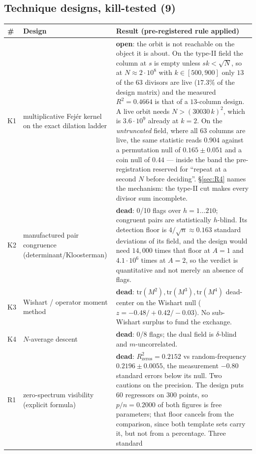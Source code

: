 \documentclass[11pt,a4paper]{article}
\theoremstyle{plain}
\theoremstyle{definition}
\begin{document}
\subsection{Technique designs, kill-tested (9)}

\begin{longtable}{p{}p{}p{}}
\hline
\# & Design & Result (pre-registered rule applied)\\
\hline
\endhead
K1 & multiplicative Fej\'er kernel on the exact dilation ladder &
 \textbf{open}: the orbit is not reachable on the object it is about.
 On the type-II field the column at $s$ is empty unless
 $sk<\sqrt N$, so at $N\approx2\cdot10^8$ with $k\in[500,900]$ only
 $13$ of the $63$ divisors are live ($17.3\%$ of the design matrix)
 and the measured $R^2 = 0.4664$ is that of a $13$-column design. A
 live orbit needs $N > (30030\,k)^2$, which is $3.6\cdot10^9$ already
 at $k=2$. On the \emph{untruncated} field, where all $63$ columns are
 live, the same statistic reads $0.904$ against a permutation null of
 $0.165\pm0.051$ and a coin null of $0.44$ --- inside the band the
 pre-registration reserved for ``repeat at a second $N$ before
 deciding''. \S\ref{sec:R4} names the mechanism: the type-II cut makes
 every divisor sum incomplete.\\
K2 & manufactured pair congruence (determinant/Kloosterman) &
 \textbf{dead}: 0/10 flags over $h = 1\ldots210$; congruent pairs are
 statistically $h$-blind. Its detection floor is
 $4/\sqrt n \approx 0.163$ standard deviations of its field, and the
 design would need $14{,}000$ times that floor at $A=1$ and
 $4.1\cdot10^6$ times at $A=2$, so the verdict is quantitative and not
 merely an absence of flags.\\
K3 & Wishart / operator moment method &
 \textbf{dead}: $\mathrm{tr}(M^2),\mathrm{tr}(M^3),\mathrm{tr}(M^4)$
 dead-center on the Wishart null ($z = -0.48/+0.42/-0.03$). No
 sub-Wishart surplus to fund the exchange.\\
K4 & $N$-average descent &
 \textbf{dead}: 0/8 flags; the dual field is $\delta$-blind and
 $m$-uncorrelated.\\
R1 & zero-spectrum visibility (explicit formula) &
 \textbf{dead}: $R^2_{\text{zeros}} = 0.2152$ vs random-frequency
 $0.2196\pm0.0055$, the measurement $-0.80$ standard errors below its
 null. Two cautions on the precision. The design puts $60$ regressors
 on $300$ points, so $p/n = 0.2000$ of both figures is free
 parameters; that floor cancels from the comparison, since both
 template sets carry it, but not from a percentage. Three standard

\end{longtable}
\end{document}

